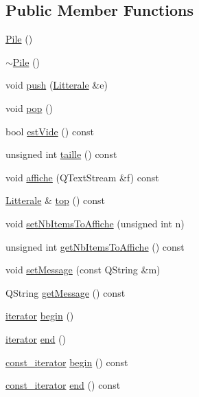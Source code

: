 \subsection*{Public Member Functions}
\begin{DoxyCompactItemize}
\item 
\hyperlink{class_pile_ab44e927107b28f5f3ac7697d10e0a739}{Pile} ()
\item 
\hyperlink{class_pile_ab2d1398d675586ff34994e2b109df152}{$\sim$\+Pile} ()
\item 
void \hyperlink{class_pile_a2c1acd99a20a3ecf41a1443cb1c1442a}{push} (\hyperlink{class_litterale}{Litterale} \&e)
\item 
void \hyperlink{class_pile_a220cde560b0896362b1d712e807450fb}{pop} ()
\item 
bool \hyperlink{class_pile_a2ca7edab82a4b7a4305093dd9ab14d71}{est\+Vide} () const 
\item 
unsigned int \hyperlink{class_pile_ac332a47f6d204fe280f199d76893036a}{taille} () const 
\item 
void \hyperlink{class_pile_ac48a5554d8fadd26e5fffc5a26d10608}{affiche} (Q\+Text\+Stream \&f) const 
\item 
\hyperlink{class_litterale}{Litterale} \& \hyperlink{class_pile_ab6a2f1cc116f12fc88975c28b92f60b5}{top} () const 
\item 
void \hyperlink{class_pile_aa61a682bdd3b9dac5d1b25e481c453d1}{set\+Nb\+Items\+To\+Affiche} (unsigned int n)
\item 
unsigned int \hyperlink{class_pile_a5f84fdfcabd4404918cecb81e83e0e67}{get\+Nb\+Items\+To\+Affiche} () const 
\item 
void \hyperlink{class_pile_adf9495ba02a31d3be1bb8bc5763ec50f}{set\+Message} (const Q\+String \&m)
\item 
Q\+String \hyperlink{class_pile_ab04b223738a2fa12b627b138a9c102ed}{get\+Message} () const 
\item 
\hyperlink{class_pile_1_1iterator}{iterator} \hyperlink{class_pile_a88900a542fe0be61e8f4da0a601e7924}{begin} ()
\item 
\hyperlink{class_pile_1_1iterator}{iterator} \hyperlink{class_pile_a02e13ab6c7171a3d98a82bf0d908ca07}{end} ()
\item 
\hyperlink{class_pile_1_1const__iterator}{const\+\_\+iterator} \hyperlink{class_pile_acc2dcef2ea52123adc1089644706225c}{begin} () const 
\item 
\hyperlink{class_pile_1_1const__iterator}{const\+\_\+iterator} \hyperlink{class_pile_a384a35669cd501233f99cce56413ba65}{end} () const 
\end{DoxyCompactItemize}


